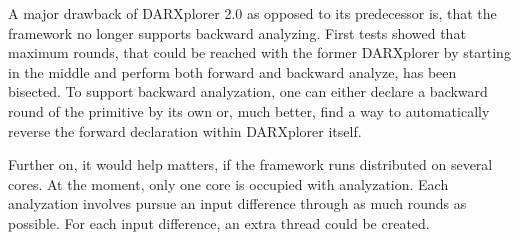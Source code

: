 \documentclass{acmtrans2m}
\begin{document}
A major drawback of DARXplorer 2.0 as opposed to its predecessor is, that the framework
no longer supports backward analyzing. First tests showed that maximum
rounds, that could be reached with the former DARXplorer by starting in the middle 
and perform both forward and backward analyze, has been bisected. To support 
backward analyzation, one can either declare a backward round of the primitive
by its own or, much better, find a way to automatically reverse the forward 
declaration within DARXplorer itself.

Further on, it would help matters, if the framework runs distributed on several cores.
At the moment, only one core is occupied with analyzation. Each analyzation involves
pursue an input difference through as much rounds as possible. For each input
difference, an extra thread could be created.


\end{document}

